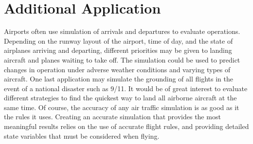 \section {Additional Application}

Airports often use simulation of arrivals and departures to evaluate operations. Depending on
the runway layout of the airport, time of day, and the state of airplanes arriving and departing,
different priorities may be given to landing aircraft and planes waiting to take off. The simulation
could be used to predict changes in operation under adverse weather conditions and varying
types of aircraft. One last application may simulate the grounding of all flights in the event of a
national disaster such as 9/11. It would be of great interest to evaluate different strategies to find
the quickest way to land all airborne aircraft at the same time. Of course, the accuracy of any air traffic simulation is as good as it the rules it uses.
Creating an accurate simulation that provides the most meaningful results relies on the use of accurate flight rules,
and providing detailed state variables that must be considered when flying.